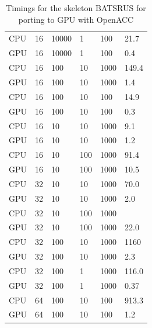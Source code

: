 \documentclass[11pt]{book} %
\begin{document}
\begin{table}[]
\begin{tabular}{llllll}
CPU        & 16    & 10000 & 1      & 100   & 21.7   \\
GPU        & 16    & 10000 & 1      & 100   & 0.4    \\
CPU        & 16    & 100   & 10     & 1000  & 149.4  \\
GPU        & 16    & 100   & 10     & 1000  & 1.4    \\
CPU        & 16    & 100   & 10     & 100   & 14.9   \\
GPU        & 16    & 100   & 10     & 100   & 0.3    \\
CPU        & 16    & 10    & 10     & 1000  & 9.1    \\
GPU        & 16    & 10    & 10     & 1000  & 1.2    \\
CPU        & 16    & 10    & 100    & 1000  & 91.4   \\
GPU        & 16    & 10    & 100    & 1000  & 10.5   \\
CPU        & 32    & 10    & 10     & 1000  & 70.0   \\
GPU        & 32    & 10    & 10     & 1000  & 2.0    \\
CPU        & 32    & 10    & 100    & 1000  &        \\
GPU        & 32    & 10    & 100    & 1000  & 22.0       \\
CPU        & 32    & 100   & 10     & 1000  & 1160   \\
GPU        & 32    & 100   & 10     & 1000  & 2.3    \\
CPU        & 32    & 100   & 1      & 1000  & 116.0  \\
GPU        & 32    & 100   & 1      & 1000  & 0.37   \\
CPU        & 64    & 100   & 10     & 100   & 913.3  \\
GPU        & 64    & 100   & 10     & 100   & 1.2   \\
\hline
\end{tabular}
\caption{Timings for the skeleton BATSRUS for porting to GPU with OpenACC}
\end{table}
\end{document}
